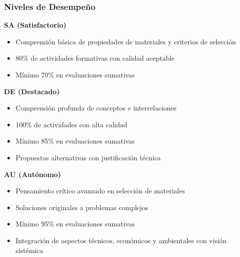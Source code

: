 \documentclass{beamer}
\begin{document}
\begin{frame}
    \frametitle{Niveles de Desempeño}
    
    \textbf{SA (Satisfactorio)}
    \begin{itemize}
        \item Comprensión básica de propiedades de materiales y criterios de selección
        \item 80\% de actividades formativas con calidad aceptable
        \item Mínimo 70\% en evaluaciones sumativas
    \end{itemize}
    \vspace{0.2cm}
    
    \textbf{DE (Destacado)}
    \begin{itemize}
        \item Comprensión profunda de conceptos e interrelaciones
        \item 100\% de actividades con alta calidad
        \item Mínimo 85\% en evaluaciones sumativas
        \item Propuestas alternativas con justificación técnica
    \end{itemize}
    \vspace{0.2cm}
    
    \textbf{AU (Autónomo)}
    \begin{itemize}
        \item Pensamiento crítico avanzado en selección de materiales
        \item Soluciones originales a problemas complejos
        \item Mínimo 95\% en evaluaciones sumativas
        \item Integración de aspectos técnicos, económicos y ambientales con visión sistémica
    \end{itemize}
\end{frame}
\end{document}
